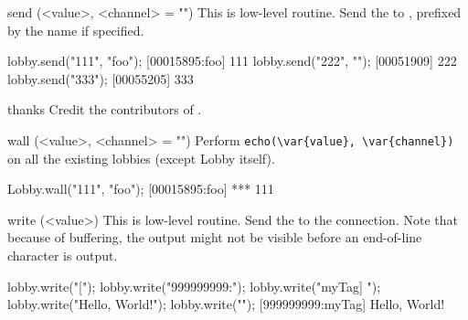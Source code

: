 \begin{urbiscriptapi}
\item[send](<value>, <channel> = "")%
  This is low-level routine.  Send the  
  to \this, prefixed by the 
   name if specified.
\begin{urbiscript}
lobby.send("111", "foo");
[00015895:foo] 111
lobby.send("222", "");
[00051909] 222
lobby.send("333");
[00055205] 333
\end{urbiscript}

\item[thanks] Credit the contributors of \usdk.

\item[wall](<value>, <channel> = "")%
  Perform \lstinline|echo(\var{value}, \var{channel})| on all the
  existing lobbies (except Lobby itself).
\begin{urbiscript}[firstnumber=1]
Lobby.wall("111", "foo");
[00015895:foo] *** 111
\end{urbiscript}

\item[write](<value>)%
  This is low-level routine.  Send the  
  to the connection.  Note that because of buffering, the output might
  not be visible before an end-of-line character is output.
\begin{urbiscript}
lobby.write("[");
lobby.write("999999999:");
lobby.write("myTag] ");
lobby.write("Hello, World!");
lobby.write("\n");
[999999999:myTag] Hello, World!
\end{urbiscript}
\end{urbiscriptapi}


